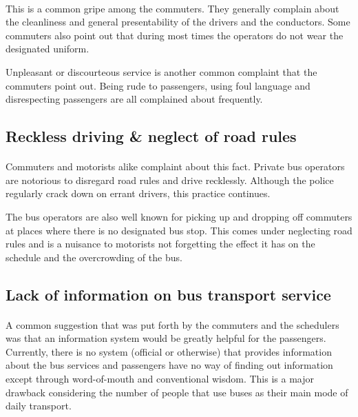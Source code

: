 \paragraph{} This is a common gripe among the commuters. They generally complain about the cleanliness and general presentability of the drivers and the conductors. Some commuters also point out that during most times the operators do not wear the designated uniform.

Unpleasant or discourteous service is another common complaint that the commuters point out. Being rude to passengers, using foul language and disrespecting passengers are all complained about frequently.

\subsection{Reckless driving \& neglect of road rules}

\paragraph{} Commuters and motorists alike complaint about this fact. Private bus operators are notorious to disregard  road rules and drive recklessly. Although the police regularly crack down on errant drivers, this practice continues. 

The bus operators are also well known for picking up and dropping off commuters at places where there is no designated bus stop. This comes under neglecting road rules and is a nuisance to motorists not forgetting the effect it has on the schedule and the overcrowding of the bus.

\subsection{Lack of information on bus transport service}

\paragraph{} A common suggestion that was put forth by the commuters and the schedulers was that an information system would be greatly helpful for the passengers. Currently, there is no system (official or otherwise) that provides information about the bus services and passengers have no way of finding out information except through word-of-mouth and conventional wisdom. This is a major drawback considering the number of people that use buses as their main mode of daily transport.



